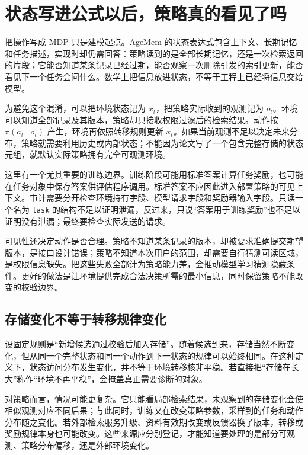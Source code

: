 \section{状态写进公式以后，策略真的看见了吗}
\label{sec:ch06-observation}

把操作写成 MDP 只是建模起点。AgeMem 的状态表达式包含上下文、长期记忆和任务描述\cite{agemem-2601}，实现时却仍需回答：策略读到的是全部长期记忆，还是一次检索返回的片段；它能否知道某条记录已经过期，能否观察一次删除引发的索引更新，能否看见下一个任务会问什么。数学上把信息放进状态，不等于工程上已经将信息交给模型。

为避免这个混淆，可以把环境状态记为 $x_t$，把策略实际收到的观测记为 $o_t$。环境可以知道全部记录及其版本，策略却只接收权限过滤后的检索结果。动作按 $\pi(a_t\mid o_t)$ 产生，环境再依照转移规则更新 $x_t$。如果当前观测不足以决定未来分布，策略就需要利用历史或内部状态；不能因为论文写了一个包含完整存储的状态元组，就默认实际策略拥有完全可观测环境。

这里有一个尤其重要的训练边界。训练阶段可能用标准答案计算任务奖励，也可能在任务对象中保存答案供评估程序调用。标准答案不应因此进入部署策略的可见上下文。审计需要分开检查环境持有字段、模型请求字段和奖励器输入字段。只读一个名为 \texttt{task} 的结构不足以证明泄漏，反过来，只说“答案用于训练奖励”也不足以证明没有泄漏；最终要检查实际发送的请求。

可见性还决定动作是否合理。策略不知道某条记录的版本，却被要求准确提交期望版本，是接口设计错误；策略不知道本次用户的范围，却需要自行猜测可读区域，是权限信息缺失。把这些失败全部计为策略能力差，会推动模型学习猜测隐藏条件。更好的做法是让环境提供完成合法决策所需的最小信息，同时保留策略不能改变的校验边界。

\subsection{存储变化不等于转移规律变化}

设固定规则是“新增候选通过校验后加入存储”。随着候选到来，存储当然不断变化，但从同一个完整状态和同一个动作到下一状态的规律可以始终相同。在这种定义下，状态访问分布发生变化，并不等于环境转移核非平稳。若直接把“存储在长大”称作“环境不再平稳”，会掩盖真正需要诊断的对象。

对策略而言，情况可能更复杂。它只能看局部检索结果，未观察到的存储变化会使相似观测对应不同后果；与此同时，训练又在改变策略参数，采样到的任务和动作分布随之变化。若外部检索服务升级、资料有效期改变或反馈器换了版本，转移或奖励规律本身也可能改变。这些来源应分别登记，才能知道要处理的是部分可观测、策略分布偏移，还是外部环境变化。


